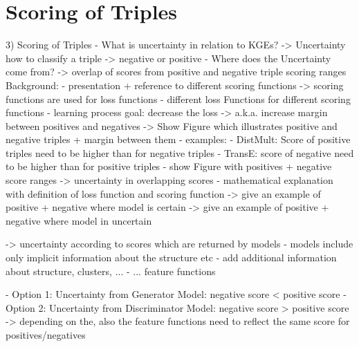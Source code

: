 \section{Scoring of Triples} 
\label{sec:scoring_of_triples}

3) Scoring of Triples
- What is uncertainty in relation to KGEs?
-> Uncertainty how to classify a triple -> negative or positive
- Where does the Uncertainty come from?
-> overlap of scores from positive and negative triple scoring ranges
Background: 
- presentation + reference to different scoring functions
-> scoring functions are used for loss functions
- different loss Functions for different scoring functions
- learning process goal: decrease the loss
-> a.k.a. increase margin between positives and negatives
-> Show Figure which illustrates positive and negative triples + margin between them
- examples:
    - DistMult: Score of positive triples need to be higher than for negative triples
    - TransE: score of negative need to be higher than for positive triples
- show Figure with positives + negative score ranges -> uncertainty in overlapping scores
- mathematical explanation with definition of loss function and scoring function
-> give an example of positive + negative where model is certain
-> give an example of positive + negative where model in uncertain

-> uncertainty according to scores which are returned by models
- models include only implicit information about the structure etc
- add additional information about structure, clusters, ...
- ... feature functions

- Option 1: Uncertainty from Generator Model: negative score < positive score
- Option 2: Uncertainty from Discriminator Model: negative score > positive score
-> depending on the, also the feature functions need to reflect the same score for positives/negatives













